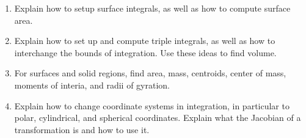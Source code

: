 

\begin{enumerate}
\item Explain how to setup surface integrals, as well as how to
compute surface area.
\item Explain how to set up and compute triple
  integrals, as well as how to interchange the bounds of
  integration. Use these ideas to find volume.
\item For surfaces and solid regions, find area,
  mass, centroids, center of mass, moments of interia, and radii of
  gyration.
\item Explain how to change coordinate systems in integration, in
  particular to polar, cylindrical, and spherical coordinates. Explain
  what the Jacobian of a transformation is and how to use it.
\end{enumerate}

